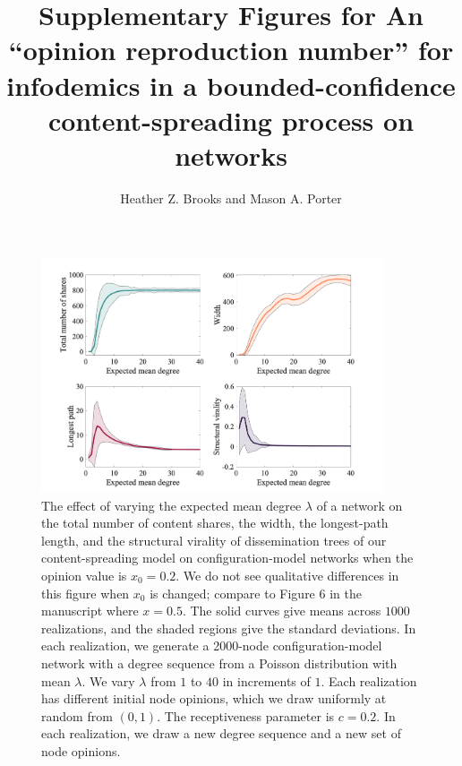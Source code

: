 \documentclass{amsart}
\title{Supplementary Figures for An ``opinion reproduction number'' for infodemics in a bounded-confidence content-spreading process on networks}
\author{Heather Z. Brooks and Mason A. Porter}
\begin{document}
\maketitle

\begin{figure}
    \centering
    \includegraphics[width=0.9\textwidth]{vary-lambda-compare-x2.png}
    \caption{The effect of varying the expected mean degree $\lambda$ of a network on the total number of content shares, the width, the longest-path length, and the structural virality of dissemination trees of our content-spreading model on configuration-model networks when the opinion value is $x_0=0.2$. 
    We do not see qualitative differences in this figure when $x_0$ is changed; compare to Figure 6 in the manuscript where $x=0.5$. 
    The solid curves give means across $1000$ realizations, and the shaded regions give the standard deviations. In each realization, we generate a 2000-node configuration-model network with a degree sequence from a Poisson distribution with mean $\lambda$. 
    We vary $\lambda$ from $1$ to $40$ in increments of $1$. Each realization has different initial node opinions, which we draw uniformly at random from $(0,1)$. 
    The receptiveness parameter is $c = 0.2$. 
    In each realization, we draw a new degree sequence and a new set of node opinions.}
\end{figure}

\newpage
\end{document}
